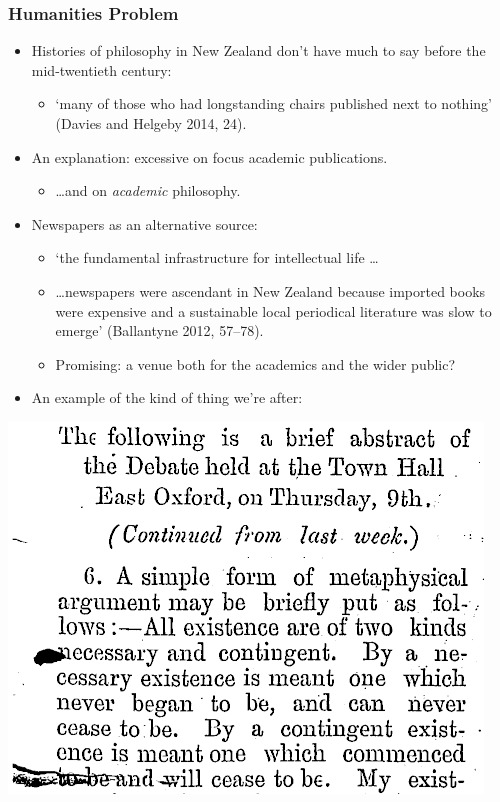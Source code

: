 \documentclass[10pt, compress]{beamer}
\begin{document}
\begin{frame}
	\frametitle{Humanities Problem}

  \pause

  \begin{itemize}[<+- | alert@+>]
		\item Histories of philosophy in New Zealand don't have much to say before the mid-twentieth century:
			\begin{itemize}
				\item `many of those who had longstanding chairs published next to nothing’ (Davies and Helgeby 2014, 24).
			\end{itemize}
		\item An explanation: excessive on focus academic publications.
		\begin{itemize}
			\item \ldots and on \emph{academic} philosophy.
		\end{itemize}
		\item Newspapers as an alternative source:
		\begin{itemize}
			\item `the fundamental infrastructure for intellectual life \ldots
			\item \ldots newspapers were ascendant in New Zealand because imported books were expensive and a sustainable local periodical literature was slow to emerge' (Ballantyne 2012, 57--78).
			\item Promising: a venue both for the academics and the wider public?
		\end{itemize}
		\item An example of the kind of thing we're after:
	\end{itemize}

\end{frame}

\begin{frame}
	\begin{center}
	\includegraphics[width=\textwidth]{images/oo.png}
	\end{center}
\end{frame}
\end{document}
